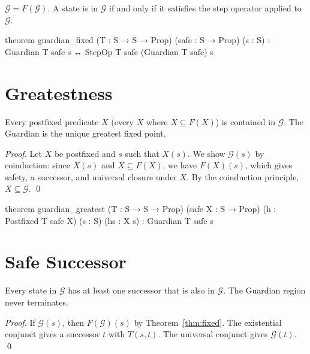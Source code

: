 \begin{theorem}\label{thm:fixed}
$\mathcal{G} = F(\mathcal{G})$. A state is in $\mathcal{G}$ if and only if it satisfies the step operator applied to $\mathcal{G}$.
\end{theorem}

\begin{leancode}
theorem guardian_fixed (T : S → S → Prop)
    (safe : S → Prop) (s : S) :
    Guardian T safe s ↔
        StepOp T safe (Guardian T safe) s
\end{leancode}

\section{Greatestness}

\begin{theorem}\label{thm:greatest}
Every postfixed predicate $X$ (every $X$ where $X \subseteq F(X)$) is contained in $\mathcal{G}$. The Guardian is the unique greatest fixed point.
\end{theorem}

\begin{proof}
Let $X$ be postfixed and $s$ such that $X(s)$. We show $\mathcal{G}(s)$ by coinduction: since $X(s)$ and $X \subseteq F(X)$, we have $F(X)(s)$, which gives safety, a successor, and universal closure under $X$. By the coinduction principle, $X \subseteq \mathcal{G}$. \qed
\end{proof}

\begin{leancode}
theorem guardian_greatest (T : S → S → Prop)
    (safe X : S → Prop) (h : Postfixed T safe X)
    (s : S) (hs : X s) : Guardian T safe s
\end{leancode}

\section{Safe Successor}

\begin{theorem}\label{thm:successor}
Every state in $\mathcal{G}$ has at least one successor that is also in $\mathcal{G}$. The Guardian region never terminates.
\end{theorem}

\begin{proof}
If $\mathcal{G}(s)$, then $F(\mathcal{G})(s)$ by Theorem~\ref{thm:fixed}. The existential conjunct gives a successor $t$ with $T(s,t)$. The universal conjunct gives $\mathcal{G}(t)$. \qed
\end{proof}

